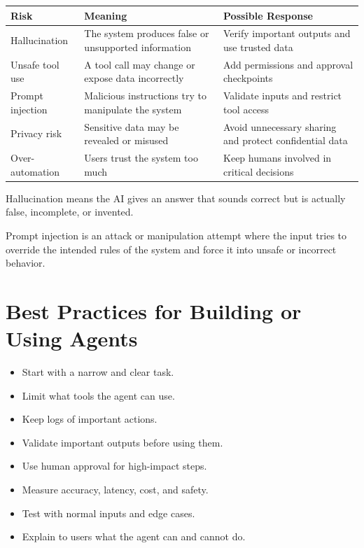 \documentclass[11pt,a4paper]{article}
\begin{document}
\begin{longtable}{@{}p{3.1cm}p{4.1cm}p{6.1cm}@{}}
\toprule
\rowcolor{primary!15}
\textbf{Risk} & \textbf{Meaning} & \textbf{Possible Response} \\
\midrule
\endhead
Hallucination & The system produces false or unsupported information & Verify important outputs and use trusted data \\
\addlinespace
Unsafe tool use & A tool call may change or expose data incorrectly & Add permissions and approval checkpoints \\
\addlinespace
Prompt injection & Malicious instructions try to manipulate the system & Validate inputs and restrict tool access \\
\addlinespace
Privacy risk & Sensitive data may be revealed or misused & Avoid unnecessary sharing and protect confidential data \\
\addlinespace
Over-automation & Users trust the system too much & Keep humans involved in critical decisions \\
\bottomrule
\end{longtable}

\begin{definitionbox}[Hallucination]
Hallucination means the AI gives an answer that sounds correct but is actually false, incomplete, or invented.
\end{definitionbox}

\begin{definitionbox}
Prompt injection is an attack or manipulation attempt where the input tries to override the intended rules of the system and force it into unsafe or incorrect behavior.
\end{definitionbox}

\section{Best Practices for Building or Using Agents}

\begin{itemize}[leftmargin=*]
  \item Start with a narrow and clear task.
  \item Limit what tools the agent can use.
  \item Keep logs of important actions.
  \item Validate important outputs before using them.
  \item Use human approval for high-impact steps.
  \item Measure accuracy, latency, cost, and safety.
  \item Test with normal inputs and edge cases.
  \item Explain to users what the agent can and cannot do.
\end{itemize}
\end{document}
